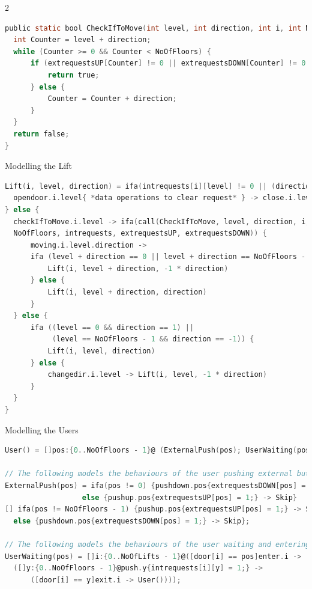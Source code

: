 \documentclass[10pt, landscape]{article}
\begin{document}
\begin{multicols*}{2}
\begin{lstlisting}[language=C, basicstyle=\scriptsize\selectfont\ttfamily, mathescape]
public static bool CheckIfToMove(int level, int direction, int i, int NoOfFloors, int[] intrequests, int[] extrequestsUP, int[] extrequestsDOWN) {
  int Counter = level + direction;
  while (Counter >= 0 && Counter < NoOfFloors) {
      if (extrequestsUP[Counter] != 0 || extrequestsDOWN[Counter] != 0 || intrequests[i * NoOfFloors + Counter] != 0) {
          return true;
      } else {
          Counter = Counter + direction;
      }
  }
  return false;
}
\end{lstlisting}

  Modelling the Lift
\begin{lstlisting}[language=C, basicstyle=\scriptsize\selectfont\ttfamily, mathescape]
Lift(i, level, direction) = ifa(intrequests[i][level] != 0 || (direction == 1 && extrequestsUP[level] == 1) || (direction == -1 && extrequestsDOWN[level] == 1)) {
  opendoor.i.level{ *data operations to clear request* } -> close.i.level{door[i] = -1;} -> Lift(i, level direction)
} else {
  checkIfToMove.i.level -> ifa(call(CheckIfToMove, level, direction, i, 
  NoOfFloors, intrequests, extrequestsUP, extrequestsDOWN)) {
      moving.i.level.direction -> 
      ifa (level + direction == 0 || level + direction == NoOfFloors - 1) {
          Lift(i, level + direction, -1 * direction)
      } else {
          Lift(i, level + direction, direction)
      }
  } else {
      ifa ((level == 0 && direction == 1) || 
           (level == NoOfFloors - 1 && direction == -1)) {
          Lift(i, level, direction)
      } else {
          changedir.i.level -> Lift(i, level, -1 * direction)
      }
  }
}
\end{lstlisting}
  \pagebreak
  Modelling the Users
\begin{lstlisting}[language=C, basicstyle=\scriptsize\selectfont\ttfamily, mathescape]
User() = []pos:{0..NoOfFloors - 1}@ (ExternalPush(pos); UserWaiting(pos));

// The following models the behaviours of the user pushing external buttons
ExternalPush(pos) = ifa(pos != 0) {pushdown.pos{extrequestsDOWN[pos] = 1;} -> Skip} 
                  else {pushup.pos{extrequestsUP[pos] = 1;} -> Skip} 
[] ifa(pos != NoOfFloors - 1) {pushup.pos{extrequestsUP[pos] = 1;} -> Skip} 
  else {pushdown.pos{extrequestsDOWN[pos] = 1;} -> Skip};

// The following models the behaviours of the user waiting and entering the lift
UserWaiting(pos) = []i:{0..NoOfLifts - 1}@([door[i] == pos]enter.i -> 
  ([]y:{0..NoOfFloors - 1}@push.y{intrequests[i][y] = 1;} -> 
      ([door[i] == y]exit.i -> User())));
\end{lstlisting}


\end{multicols*}
\end{document}
